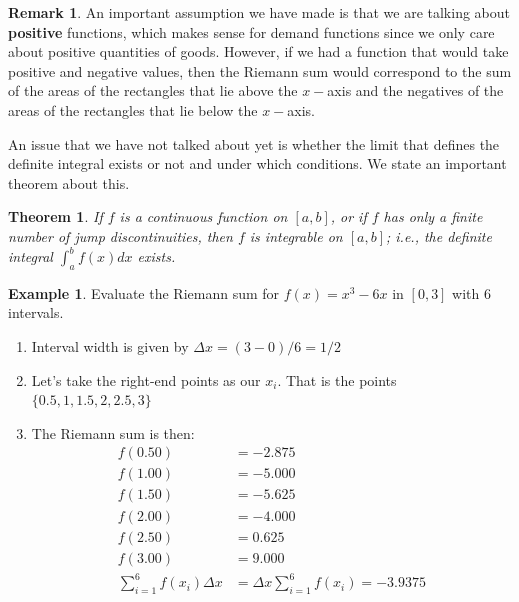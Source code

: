 \documentclass[a4paper,11pt]{article}
\theoremstyle{definition}
\newtheorem{example}{Example}
\newtheorem{remark}{Remark}
\theoremstyle{plain}
\newtheorem{theorem}{Theorem}
\begin{document}
\begin{remark}
An important assumption we have made is that we are talking about \textbf{positive} functions, which makes sense for demand functions since we only care about positive quantities of goods. However, if we had a function that would take positive and negative
values, then the Riemann sum would correspond to the sum of the areas of the rectangles that lie above the \(x-\)axis and the negatives of the areas of the rectangles that lie below the \(x-\)axis.
\end{remark}

An issue that we have not talked about yet is whether the limit that
defines the definite integral exists or not and under which conditions.
We state an important theorem about this.

\begin{theorem}
If \(f\) is a continuous function on \([a,b]\), or if \(f\) has only a finite number of jump discontinuities, then \(f\) is integrable on \([a,b]\); i.e., the definite integral \(\int^b_a f(x) dx\) exists.
\end{theorem}


\begin{example}
Evaluate the Riemann sum for \(f(x) = x^3 - 6x\) in \([0,3]\) with \(6\) intervals.

\begin{enumerate}
\item Interval width is given by \(\Delta x = (3-0)/ 6 = 1/2\)
\item Let's take the right-end points as our \(x_i\). That is the points \(\{0.5, 1, 1.5, 2, 2.5, 3\}\)
\item The Riemann sum is then:
\begin{align*}
f(0.50) &= -2.875 \\
f(1.00) &= -5.000 \\
f(1.50) &= -5.625 \\
f(2.00) &= -4.000 \\
f(2.50) &=  0.625 \\
f(3.00) &=  9.000 \\
\sum^6_{i=1} f(x_i)\Delta x &= \Delta x \sum^{6}_{i=1}f(x_i) = -3.9375
\end{align*}

\end{enumerate}
\end{example}
\end{document}
